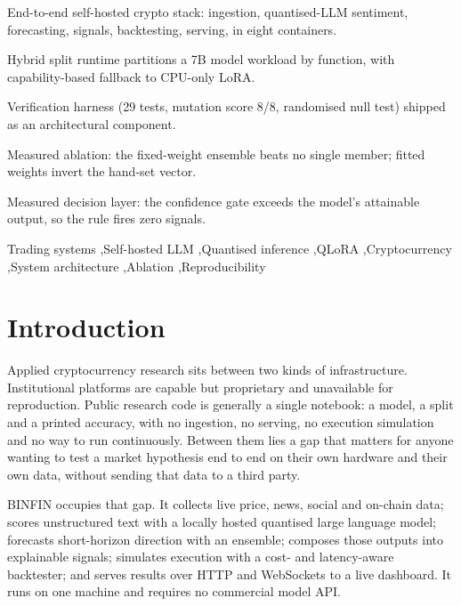 \documentclass[preprint,12pt,authoryear]{elsarticle}
\begin{document}
\begin{frontmatter}
\begin{highlights}
\item End-to-end self-hosted crypto stack: ingestion, quantised-LLM sentiment, forecasting, signals, backtesting, serving, in eight containers.
\item Hybrid split runtime partitions a 7B model workload by function, with capability-based fallback to CPU-only LoRA.
\item Verification harness (29 tests, mutation score 8/8, randomised null test) shipped as an architectural component.
\item Measured ablation: the fixed-weight ensemble beats no single member; fitted weights invert the hand-set vector.
\item Measured decision layer: the confidence gate exceeds the model's attainable output, so the rule fires zero signals.
\end{highlights}

\begin{keyword}
Trading systems \sep Self-hosted LLM \sep Quantised inference \sep QLoRA
\sep Cryptocurrency \sep System architecture \sep Ablation \sep Reproducibility
\end{keyword}

\end{frontmatter}

\section{Introduction}
\label{sec:intro}

Applied cryptocurrency research sits between two kinds of infrastructure.
Institutional platforms are capable but proprietary and unavailable for
reproduction. Public research code is generally a single notebook: a model, a
split and a printed accuracy, with no ingestion, no serving, no execution
simulation and no way to run continuously. Between them lies a gap that matters
for anyone wanting to test a market hypothesis end to end on their own hardware
and their own data, without sending that data to a third party.

BINFIN occupies that gap. It collects live price, news, social and on-chain
data; scores unstructured text with a locally hosted quantised large language
model; forecasts short-horizon direction with an ensemble; composes those outputs
into explainable signals; simulates execution with a cost- and latency-aware
backtester; and serves results over HTTP and WebSockets to a live dashboard. It
runs on one machine and requires no commercial model API.
\end{document}
